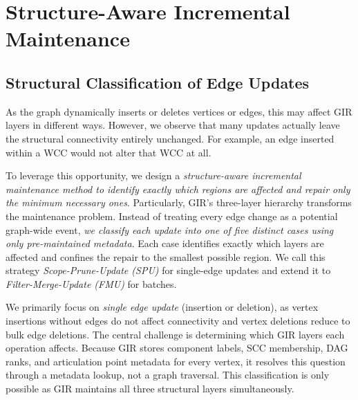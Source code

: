 \section{Structure-Aware Incremental Maintenance}
\label{sec: maintenance}



\subsection{Structural Classification of Edge Updates}




As the graph dynamically inserts or deletes vertices or edges, this may affect GIR layers in different ways.
However, we observe that many updates actually leave the structural connectivity entirely unchanged. For example, an edge inserted within a WCC would not alter that WCC at all. 

To leverage this opportunity, we design a \textit{structure-aware incremental maintenance method to identify exactly which regions are affected and repair only the minimum necessary ones}.
Particularly, GIR's three-layer hierarchy transforms the maintenance problem.
Instead of treating every edge change as a potential graph-wide event, \textit{we classify each update into one of five distinct cases using only pre-maintained metadata}.
Each case identifies exactly which layers are affected and confines the repair to the smallest possible region.
We call this strategy \textit{Scope-Prune-Update (SPU)} for single-edge updates and extend it to \textit{Filter-Merge-Update (FMU)} for batches.

We primarily focus on \textit{single edge update} (insertion or deletion), as vertex insertions without edges do not affect connectivity and vertex deletions reduce to bulk edge deletions.
The central challenge is determining which GIR layers each operation affects.
Because GIR stores component labels, SCC membership, DAG ranks, and articulation point metadata for every vertex, it resolves this question through a metadata lookup, not a graph traversal.
This classification is only possible as GIR maintains all three structural layers simultaneously.

